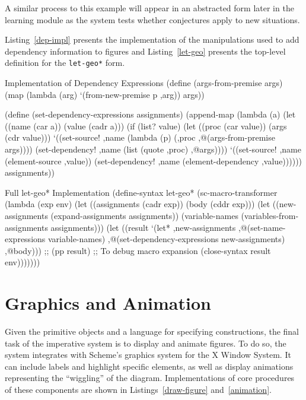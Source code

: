 A similar process to this example will appear in an abstracted form
later in the learning module as the system tests whether conjectures
apply to new situations.

\newpage
Listing~\ref{dep-impl} presents the implementation of the
manipulations used to add dependency information to figures and
Listing~\ref{let-geo} presents the top-level definition for the
\texttt{let-geo*} form.

\begin{code-listing}
[label=dep-impl]
{Implementation of Dependency Expressions}
(define (args-from-premise args)
  (map (lambda (arg)
         `(from-new-premise p ,arg))
       args))

(define (set-dependency-expressions assignments)
  (append-map
   (lambda (a)
     (let ((name (car a))
           (value (cadr a)))
       (if (list? value)
           (let ((proc (car value))
                 (args (cdr value)))
             `((set-source!
                ,name (lambda (p) (,proc ,@(args-from-premise args))))
               (set-dependency!
                ,name (list (quote ,proc) ,@args))))
           `((set-source! ,name (element-source ,value))
             (set-dependency! ,name (element-dependency ,value))))))
   assignments))
\end{code-listing}

\begin{code-listing}
[label=let-geo]
{Full let-geo* Implementation}
(define-syntax let-geo*
  (sc-macro-transformer
   (lambda (exp env)
     (let ((assignments (cadr exp))
           (body (cddr exp)))
       (let ((new-assignments (expand-assignments assignments))
             (variable-names (variables-from-assignments assignments)))
         (let ((result `(let*
                            ,new-assignments
                          ,@(set-name-expressions variable-names)
                          ,@(set-dependency-expressions new-assignments)
                          ,@body)))
           ;; (pp result) ;; To debug macro expansion
           (close-syntax result env)))))))
\end{code-listing}

\newpage
\section{Graphics and Animation}

Given the primitive objects and a language for specifying
constructions, the final task of the imperative system is to display
and animate figures. To do so, the system integrates with Scheme's graphics
system for the X Window System. It can include labels and highlight specific
elements, as well as display animations representing the ``wiggling''
of the diagram. Implementations of core procedures of these components
are shown in Listings~\ref{draw-figure} and~\ref{animation}.

